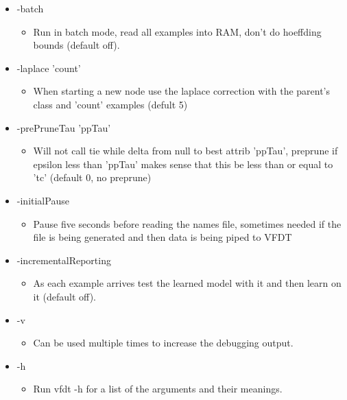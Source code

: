 \begin{itemize}
\item -batch\begin{itemize}
\item Run in batch mode, read all examples into RAM, don't do hoeffding bounds (default off).\end{itemize}
\item -laplace 'count'\begin{itemize}
\item When starting a new node use the laplace correction with the parent's class and 'count' examples (defult 5)\end{itemize}
\item -pre\-Prune\-Tau 'pp\-Tau'\begin{itemize}
\item Will not call tie while delta from null to best attrib 'pp\-Tau', preprune if epsilon less than 'pp\-Tau' makes sense that this be less than or equal to 'tc' (default 0, no preprune)\end{itemize}
\item -initial\-Pause\begin{itemize}
\item Pause five seconds before reading the names file, sometimes needed if the file is being generated and then data is being piped to VFDT\end{itemize}
\item -incremental\-Reporting\begin{itemize}
\item As each example arrives test the learned model with it and then learn on it (default off).\end{itemize}
\item -v\begin{itemize}
\item Can be used multiple times to increase the debugging output.\end{itemize}
\item -h\begin{itemize}
\item Run vfdt -h for a list of the arguments and their meanings.\end{itemize}
\end{itemize}


